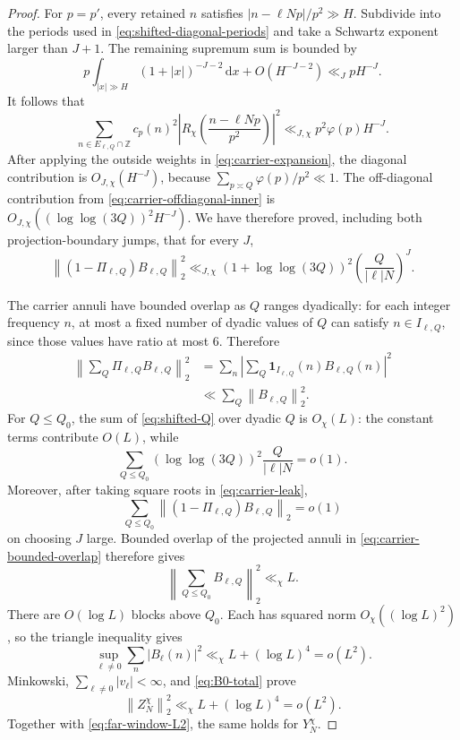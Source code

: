 \documentclass[11pt]{article}
\numberwithin{equation}{section}
\theoremstyle{definition}
\newcommand{\Z}{\mathbb Z}
\newcommand{\1}{\mathbf 1}
\newcommand{\dd}{\,\mathrm d}
\newcommand{\norm}[1]{\left\lVert#1\right\rVert}
\begin{document}
\begin{proof}
For \(p=p'\), every retained \(n\) satisfies
\(|n-\ell Np|/p^2\gg H\).  Subdivide into the periods used in
\eqref{eq:shifted-diagonal-periods} and take a Schwartz exponent larger
than \(J+1\).  The remaining supremum sum is bounded by
\[
 p\int_{|x|\gg H}(1+|x|)^{-J-2}\dd x+O(H^{-J-2})
 \ll_JpH^{-J}.
\]
It follows that
\begin{equation}\label{eq:carrier-diagonal-inner}
 \sum_{n\in E_{\ell,Q}\cap\Z}c_p(n)^2
 \left|R_\chi\left(\frac{n-\ell Np}{p^2}\right)\right|^2
 \ll_{J,\chi}p^2\varphi(p)H^{-J}.
\end{equation}
After applying the outside weights in
\eqref{eq:carrier-expansion}, the diagonal contribution is
\(O_{J,\chi}(H^{-J})\), because
\(\sum_{p\asymp Q}\varphi(p)/p^2\ll1\).  The off-diagonal contribution
from \eqref{eq:carrier-offdiagonal-inner} is
\(O_{J,\chi}((\log\log(3Q))^2H^{-J})\).  We have therefore proved,
including both projection-boundary jumps, that for every \(J\),
\begin{equation}\label{eq:carrier-leak}
 \norm{(1-\Pi_{\ell,Q})B_{\ell,Q}}_2^2
 \ll_{J,\chi}
 (1+\log\log(3Q))^2
 \left(\frac{Q}{|\ell|N}\right)^J.
\end{equation}

The carrier annuli have bounded overlap as \(Q\) ranges dyadically:
for each integer frequency \(n\), at most a fixed number of dyadic
values of \(Q\) can satisfy \(n\in I_{\ell,Q}\), since those values
have ratio at most \(6\).  Therefore
\begin{equation}\label{eq:carrier-bounded-overlap}
 \begin{split}
 \left\|\sum_Q\Pi_{\ell,Q}B_{\ell,Q}\right\|_2^2
 &=\sum_n\left|\sum_Q
 \1_{I_{\ell,Q}}(n)B_{\ell,Q}(n)\right|^2\\
 &\ll\sum_Q\norm{B_{\ell,Q}}_2^2.
 \end{split}
\end{equation}
For \(Q\le Q_0\), the sum of \eqref{eq:shifted-Q} over dyadic \(Q\) is
\(O_\chi(L)\): the constant terms contribute \(O(L)\), while
\[
 \sum_{Q\le Q_0}(\log\log(3Q))^2\frac{Q}{|\ell|N}=o(1).
\]
Moreover, after taking square roots in \eqref{eq:carrier-leak},
\[
 \sum_{Q\le Q_0}
 \norm{(1-\Pi_{\ell,Q})B_{\ell,Q}}_2=o(1)
\]
on choosing \(J\) large.  Bounded overlap of the projected annuli
in \eqref{eq:carrier-bounded-overlap} therefore gives
\begin{equation}\label{eq:low-Q}
 \left\|\sum_{Q\le Q_0}B_{\ell,Q}\right\|_2^2\ll_\chi L.
\end{equation}
There are \(O(\log L)\) blocks above \(Q_0\).  Each has squared norm
\(O_\chi((\log L)^2)\), so the triangle inequality gives
\[
 \sup_{\ell\ne0}\sum_n|B_\ell(n)|^2
 \ll_\chi L+(\log L)^4=o(L^2).
\]
Minkowski, \(\sum_{\ell\ne0}|v_\ell|<\infty\), and
\eqref{eq:B0-total} prove
\[
 \norm{Z_N^\chi}_2^2\ll_\chi L+(\log L)^4=o(L^2).
\]
Together with \eqref{eq:far-window-L2}, the same holds for
\(Y_N^\chi\).


\end{proof}
\end{document}
